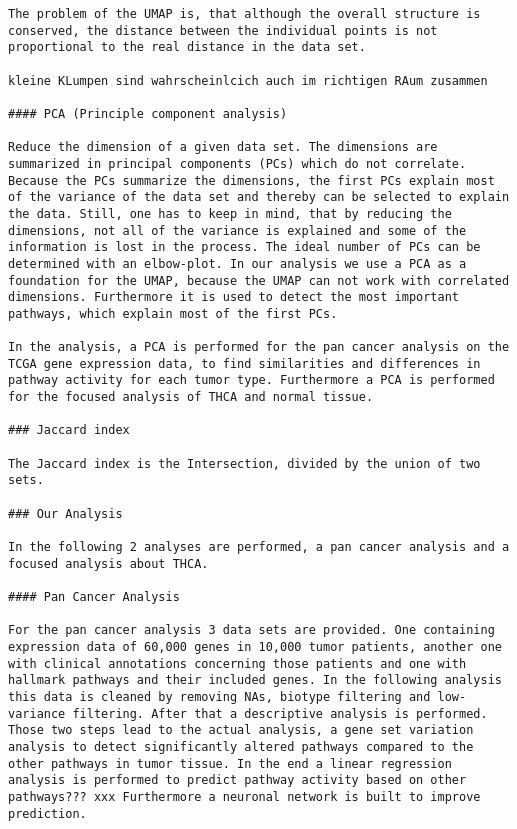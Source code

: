 \documentclass[
  parskip,
  oneside]{scrreprt}
\begin{document}
\begin{verbatim}
The problem of the UMAP is, that although the overall structure is conserved, the distance between the individual points is not proportional to the real distance in the data set.

kleine KLumpen sind wahrscheinlcich auch im richtigen RAum zusammen

#### PCA (Principle component analysis)

Reduce the dimension of a given data set. The dimensions are summarized in principal components (PCs) which do not correlate. Because the PCs summarize the dimensions, the first PCs explain most of the variance of the data set and thereby can be selected to explain the data. Still, one has to keep in mind, that by reducing the dimensions, not all of the variance is explained and some of the information is lost in the process. The ideal number of PCs can be determined with an elbow-plot. In our analysis we use a PCA as a foundation for the UMAP, because the UMAP can not work with correlated dimensions. Furthermore it is used to detect the most important pathways, which explain most of the first PCs.

In the analysis, a PCA is performed for the pan cancer analysis on the TCGA gene expression data, to find similarities and differences in pathway activity for each tumor type. Furthermore a PCA is performed for the focused analysis of THCA and normal tissue.

### Jaccard index

The Jaccard index is the Intersection, divided by the union of two sets.

### Our Analysis

In the following 2 analyses are performed, a pan cancer analysis and a focused analysis about THCA.

#### Pan Cancer Analysis

For the pan cancer analysis 3 data sets are provided. One containing expression data of 60,000 genes in 10,000 tumor patients, another one with clinical annotations concerning those patients and one with hallmark pathways and their included genes. In the following analysis this data is cleaned by removing NAs, biotype filtering and low-variance filtering. After that a descriptive analysis is performed. Those two steps lead to the actual analysis, a gene set variation analysis to detect significantly altered pathways compared to the other pathways in tumor tissue. In the end a linear regression analysis is performed to predict pathway activity based on other pathways??? xxx Furthermore a neuronal network is built to improve prediction.


\end{verbatim}
\end{document}
